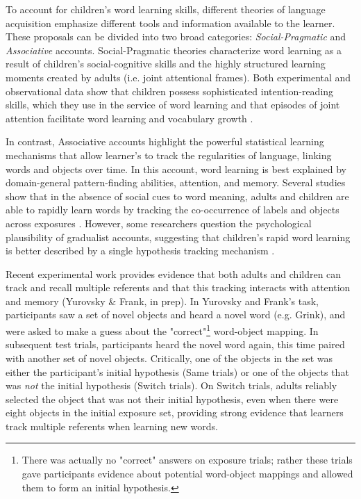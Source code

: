\documentclass[10pt,letterpaper]{article}
\begin{document}
To account for children's word learning skills, different theories of language acquisition emphasize different tools and information available to the learner. These proposals can be divided into two broad categories: \emph{Social-Pragmatic} and \emph{Associative} accounts. Social-Pragmatic theories characterize word learning as a result of children's social-cognitive skills and the highly structured learning moments created by adults (i.e. joint attentional frames).  Both experimental and observational data show that children possess sophisticated intention-reading skills, which they use in the service of word learning \cite{baldwin1993infants} and that episodes of joint attention facilitate word learning and vocabulary growth \cite{brooks2008infant}.  

In contrast, Associative accounts highlight the powerful statistical learning mechanisms that allow learner's to track the regularities of language, linking words and objects over time. In this account, word learning is best explained by domain-general pattern-finding abilities, attention, and memory. Several studies show that in the absence of social cues to word meaning, adults and children are able to rapidly learn words by tracking the co-occurrence of labels and objects across exposures \cite{smith2008infants,vouloumanos2008fine}. However, some researchers question the psychological plausibility of gradualist accounts, suggesting that children's rapid word learning is better described by a single hypothesis tracking mechanism \cite{trueswell2013propose,medina2011words}. 

Recent experimental work provides evidence that both adults and children can track and recall multiple referents and that this tracking interacts with attention and memory (Yurovsky & Frank, in prep). In Yurovsky and Frank's task, participants saw a set of novel objects and heard a novel word (e.g. Grink), and were asked to make a guess about the "correct"\footnote{There was actually no "correct" answers on exposure trials; rather these trials gave participants evidence about potential word-object mappings and allowed them to form an initial hypothesis.} word-object mapping. In subsequent test trials, participants heard the novel word again, this time paired with another set of novel objects. Critically, one of the objects in the set was either the participant's initial hypothesis (Same trials) or one of the objects that was \emph{not} the initial hypothesis (Switch trials). On Switch trials, adults reliably selected the object that was not their initial hypothesis, even when there were eight objects in the initial exposure set, providing strong evidence that learners track multiple referents when learning new words. 
\end{document}
